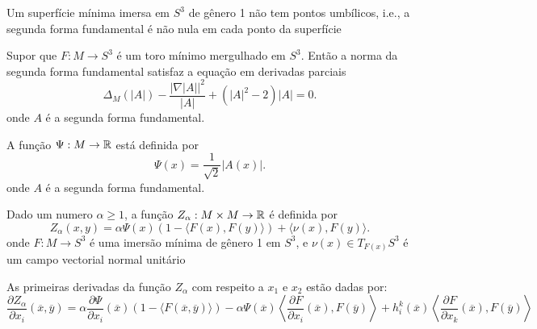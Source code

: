\cite{Brendle2013}
\cite{Brendle2013a}

\begin{proposicao}
	Um superfície mínima imersa em $S^3$ de gênero 1 não tem pontos umbílicos, i.e., a segunda forma fundamental é não nula em cada ponto da superfície
\end{proposicao}

\begin{proposicao}
	Supor que $F: M \rightarrow S^3$ é um toro mínimo mergulhado em $S^3$. Então a norma da segunda forma fundamental satisfaz a equação em derivadas parciais
	\begin{equation*}
		\Delta_M (|A|) - \frac{| \nabla |A| |^2}{|A|} + (|A|^2 - 2) |A| = 0.
	\end{equation*}
	onde $A$ é a segunda forma fundamental.
\end{proposicao}

\begin{definicao}
	A função $\Psi: M \rightarrow \mathbb{R}$ está definida por
	\begin{equation*}
		\Psi(x) = \frac{1}{\sqrt{2}} |A(x)|.
	\end{equation*}
	onde $A$ é a segunda forma fundamental.
\end{definicao}

\begin{definicao}
	Dado um numero $\alpha \geq 1$, a função $Z_{\alpha}: M \times M \rightarrow \mathbb{R}$ é definida por
	\begin{equation*}
		Z_{\alpha}(x,y) = \alpha \Psi(x) (1 - \langle F(x), F(y) \rangle) + \langle \nu(x), F(y) \rangle.
	\end{equation*}
	onde $F: M \rightarrow S^3$ é uma imersão mínima de gênero 1 em $S^3$, e $\nu(x) \in T_{F(x)} S^3$ é um campo vectorial normal unitário
\end{definicao}

\begin{proposicao}\label{primeira_derivada_x_Z}
	As primeiras derivadas da função $Z_{\alpha}$ com respeito a $x_1$ e $x_2$ estão dadas por:
	\begin{equation*}
	\frac{\partial Z_{\alpha}}{\partial x_i} (\overline{x}, \overline{y}) = \alpha \frac{\partial \Psi}{\partial x_i}(\overline{x}) (1 - \langle F(\overline{x}, \overline{y}) \rangle) - \alpha \Psi(\overline{x}) \left\langle \frac{\partial F}{\partial x_i}(\overline{x}), F(\overline{y}) \right\rangle + h_i^k(\overline{x}) \left\langle \frac{\partial F}{\partial x_k}(\overline{x}), F(\overline{y}) \right\rangle
	\end{equation*}
\end{proposicao}


